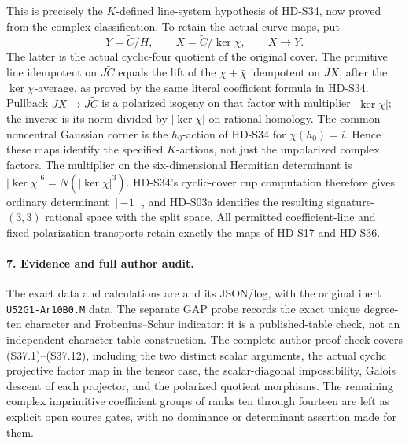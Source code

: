 This is precisely the \(K\)-defined line-system hypothesis of
HD-S34, now proved from the complex classification. To retain
the actual curve maps, put
\[
      Y=\widetilde C/H,\qquad
      X=\widetilde C/\ker\chi,\qquad X\longrightarrow Y.
                                                               \tag{S37.12}
\]
The latter is the actual cyclic-four quotient of the original
cover. The primitive line idempotent on \(J\widetilde C\)
equals the lift of the \(\chi+\bar\chi\) idempotent on
\(JX\), after the \(\ker\chi\)-average, as proved by
the same literal coefficient formula in HD-S34. Pullback
\(JX\to J\widetilde C\) is a polarized isogeny on that
factor with multiplier \(|\ker\chi|\); the inverse is its
norm divided by \(|\ker\chi|\) on rational homology.
The common noncentral Gaussian corner is the \(h_0\)-action
of HD-S34 for \(\chi(h_0)=i\). Hence these maps identify
the specified \(K\)-actions, not just the unpolarized complex
factors. The multiplier on the six-dimensional Hermitian
determinant is \(|\ker\chi|^6=N(|\ker\chi|^3)\).
HD-S34's cyclic-cover cup computation therefore gives ordinary
determinant \([-1]\), and HD-S03a identifies the resulting
signature-\((3,3)\) rational space with the split space.
All permitted coefficient-line and fixed-polarization transports
retain exactly the maps of HD-S17 and HD-S36.

\paragraph{7. Evidence and full author audit.}
The exact data and calculations are
and its JSON/log, with the original inert
\texttt{U52G1-Ar10B0.M} data.
The separate GAP probe records the exact unique degree-ten
character and Frobenius--Schur indicator; it is a published-table
check, not an independent character-table construction.
The complete author proof check covers (S37.1)--(S37.12), including
the two distinct scalar arguments, the actual cyclic projective
factor map in the tensor case, the scalar-diagonal impossibility,
Galois descent of each projector, and the polarized quotient
morphisms. The remaining complex imprimitive coefficient groups
of ranks ten through fourteen are left as explicit open source
gates, with no dominance or determinant assertion made for them.
